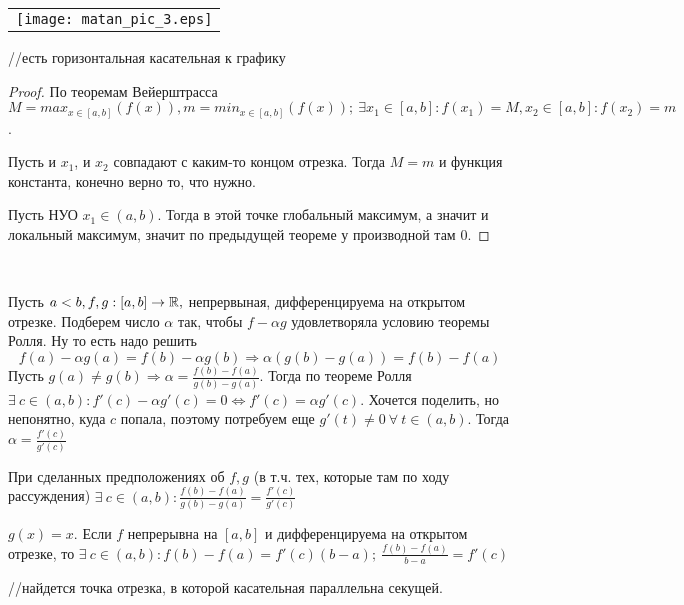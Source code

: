 \documentclass[12pt]{report}
\begin{document}
\begin{center}
\begin{tabular}{c}
\texttt{[image: matan\_pic\_3.eps]}\\
\end{tabular}
\end{center}
//есть горизонтальная касательная к графику
\begin{proof}
По теоремам Вейерштрасса $M = max_{x \in [a, b]}(f(x)), m = min_{x \in [a, b]}(f(x)); ~\exists x_1 \in [a, b]: f(x_1) = M, x_2 \in [a, b]: f(x_2) = m$. 

Пусть и $x_1$, и $x_2$ совпадают с каким-то концом отрезка. Тогда $M = m$ и функция константа, конечно верно то, что нужно.

Пусть НУО $x_1 \in (a, b)$. Тогда в этой точке глобальный максимум, а значит и локальный максимум, значит по предыдущей теореме у производной там $0$.
\end{proof}

\ \
\rightline{\it - Конечно нельзя (с) КИ}
\ \

Пусть $a < b, f, g: [a, b] \to \mathbb{R},$ непрервыная, дифференцируема на открытом отрезке. Подберем число $\alpha$ так, чтобы $f - \alpha g$ удовлетворяла условию теоремы Ролля. Ну то есть надо решить
$$f(a) - \alpha g(a) = f(b) - \alpha g(b) \Rightarrow \alpha (g(b) - g(a)) = f(b) - f(a)$$
Пусть $g(a) \neq g(b) \Rightarrow \alpha = \frac{f(b) - f(a)}{g(b) - g(a)}$. Тогда по теореме Ролля $\exists ~c \in (a, b): f'(c) - \alpha g'(c) = 0 \Leftrightarrow f'(c) = \alpha g'(c)$. Хочется поделить, но непонятно, куда $c$ попала, поэтому потребуем еще $g'(t) \neq 0 ~\forall ~t \in (a, b)$. Тогда $\alpha = \frac{f'(c)}{g'(c)}$

\begin{thm}
При сделанных предположениях об $f, g$ (в т.ч. тех, которые там по ходу рассуждения) $\exists ~ c \in (a, b): \frac{f(b) - f(a)}{g(b) - g(a)} = \frac{f'(c)}{g'(c)}$
\end{thm}

\begin{cor}

$g(x) = x$. Если $f$ непрерывна на $[a, b]$ и дифференцируема на открытом отрезке, то $\exists ~c \in (a, b): f(b) - f(a) = f'(c)(b - a); ~\frac{f(b) - f(a)}{b - a} = f'(c)$

//найдется точка отрезка, в которой касательная параллельна секущей.
\end{cor}
\end{document}
